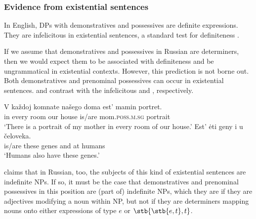 \documentclass[output=paper,
colorlinks,
citecolor=brown,
newtxmath
]{langscibook}
\begin{document}

\subsubsection{Evidence from existential sentences}

In English, DPs with demonstratives and possessives are definite expressions. They are infelicitous in existential sentences, a standard test for definiteness \citep{Milsark1977,Bach1987}.


\ea\label{standard_definiteness}
\z\z 

\noindent If we assume that demonstratives and possessives in Russian are determiners, then we would expect them to be associated with definiteness and be ungrammatical in existential contexts. However, this prediction is not borne out. Both demonstratives and prenominal possessives can occur in existential sentences.  and  contrast with the infelicitous  and , respectively.


\ea 
    \ea\label{32_a} \gll V každoj komnate našego doma est' mamin portret.\\
    in every room our house is/are mom.\textsc{poss.m.sg} portrait\\
    \glt `There is a portrait of my mother in every room of our house.'
    \ex\label{32_b} \gll Est' ėti geny i u čeloveka.\\
    is/are these genes and at humans\\
    \glt `Humans also have these genes.'
\z\z

\noindent \citet{Paduceva2000} claims that in Russian, too, the subjects of this kind of existential sentences are indefinite NPs. If so, it must be the case that demonstratives and prenominal possessives in this position are (part of) indefinite NPs, which they are if they are adjectives modifying a noun within NP, but not if they are determiners mapping nouns onto either expressions of type $e$ or $\stb{\stb{e,t}, t}$.                                             
\end{document}
